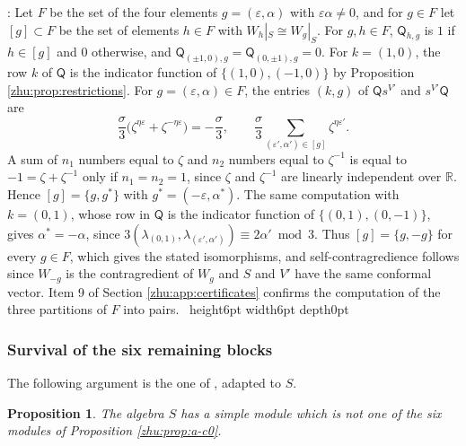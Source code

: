 \documentclass[leqno]{article}
\newcommand{\qed}{\hfill \vrule height6pt  width6pt depth0pt}
\newcommand{\epsi}{\varepsilon}
\newtheorem{prop}[thm]{Proposition}
\newenvironment{proof}[1][]{\noindent {\it Proof #1} : }{\hbox{~}\qed
\smallskip
}
\numberwithin{equation}{section}
\begin{document}
\begin{proof}
Let $F$ be the set of the four elements $g = (\epsi,\alpha)$ with $\epsi\alpha \neq 0$, and for $g \in F$ let $[g] \subset F$ be the set of elements $h \in F$ with $W_h|_S \cong W_g|_S$. For $g, h \in F$, $\mathsf Q_{h,g}$ is $1$ if $h \in [g]$ and $0$ otherwise, and $\mathsf Q_{(\pm1,0),g} = \mathsf Q_{(0,\pm1),g} = 0$. For $k = (1,0)$, the row $k$ of $\mathsf Q$ is the indicator function of $\{(1,0),(-1,0)\}$ by Proposition \ref{zhu:prop:restrictions}. For $g = (\epsi,\alpha) \in F$, the entries $(k,g)$ of $\mathsf Q s^{V'}$ and $s^{V'} \mathsf Q$ are
\[
\frac{\sigma}{3}\big(\zeta^{\eta\epsi} + \zeta^{-\eta\epsi}\big) = -\frac{\sigma}{3}, \qquad \frac{\sigma}{3}\sum_{(\epsi',\alpha') \in [g]} \zeta^{\eta\epsi'}.
\]
A sum of $n_1$ numbers equal to $\zeta$ and $n_2$ numbers equal to $\zeta^{-1}$ is equal to $-1 = \zeta + \zeta^{-1}$ only if $n_1 = n_2 = 1$, since $\zeta$ and $\zeta^{-1}$ are linearly independent over $\mathbb{R}$. Hence $[g] = \{g, g^*\}$ with $g^* = (-\epsi,\alpha^*)$. The same computation with $k = (0,1)$, whose row in $\mathsf Q$ is the indicator function of $\{(0,1),(0,-1)\}$, gives $\alpha^* = -\alpha$, since $3(\lambda_{(0,1)},\lambda_{(\epsi',\alpha')}) \equiv 2\alpha' \bmod 3$. Thus $[g] = \{g,-g\}$ for every $g \in F$, which gives the stated isomorphisms, and self-contragredience follows since $W_{-g}$ is the contragredient of $W_g$ and $S$ and $V'$ have the same conformal vector. Item 9 of Section \ref{zhu:app:certificates} confirms the computation of the three partitions of $F$ into pairs.
\end{proof}

\subsubsection{Survival of the six remaining blocks}
\label{zhu:subsec:survival}

The following argument is the one of \cite[Lemma 11.3 p.~61]{Rie26b}, adapted to $S$.

\begin{prop}
\label{zhu:prop:seven}
The algebra $S$ has a simple module which is not one of the six modules of Proposition \ref{zhu:prop:a-c0}.
\end{prop}
\end{document}
